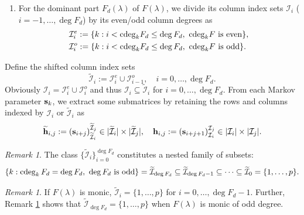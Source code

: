 \documentclass[12pt,reqno]{amsart}
\theoremstyle{plain}
\numberwithin{equation}{section}
\theoremstyle{remark}
\newtheorem{remark}[theorem]{Remark}
\def\wtilde{\widetilde} \def\what{\widehat}
\begin{document}
\begin{enumerate}[label=\textbf{Step \arabic*}, start=4, align=left, leftmargin=*]
\item \label{step4} For the dominant part $F_d(\lambda)$ of $F(\lambda)$, we divide its column index sets $\mathcal I_i$ ($i=-1,\ldots,\deg F_d$) by its even/odd column degrees as
\begin{align*}
&\mathcal I_i^e:=\{k : i< {\rm cdeg}_kF_d\leq \deg F_d,\ {\rm cdeg}_kF  {\rm\ is\ even}\},\\
&\mathcal I_i^o:=\{k : i< {\rm cdeg}_kF_d\leq \deg F_d,\ {\rm cdeg}_kF  {\rm\ is\ odd}\}.
\end{align*}
\end{enumerate}
 Define the shifted column index sets 
$$
\wtilde {\mathcal I}_i:=\mathcal I_i^e\cup \mathcal I_{i-1}^o,\quad  i=0,\ldots,\deg F_d.
$$
Obviously $\mathcal I_i=\mathcal I_i^e\cup \mathcal I_i^o$ and thus $\mathcal I_i \subseteq \wtilde {\mathcal I}_i$ for $i=0,\ldots,\deg F_d$.
 From each Markov parameter ${\bf s}_k$, we extract some submatrices by retaining the rows and columns indexed by $\mathcal I_i$ or $\wtilde {\mathcal I}_i$  as 
$$\wtilde {\bf h}_{i,j}:=\left({\bf s}_{i+j}\right)_{\wtilde {\mathcal I}_i}^{\wtilde {\mathcal I}_j}\in |\wtilde {\mathcal I}_i|\times |\wtilde {\mathcal I}_j|,\quad {\bf  h}_{i,j}:=\left({\bf s}_{i+j+1}\right)_{\mathcal I_i}^{\mathcal I_j}\in |\mathcal I_i|\times |\mathcal I_j|.
$$


\begin{remark}\label{RemtildeFd}
The class $\{\wtilde {\mathcal I}_i\}_{i=0}^{\deg F_d}$ constitutes a nested family of subsets:
    $$ \left\{ k : \operatorname{cdeg}_k F_d = \deg F_d,\ \deg F_d {\rm\ is\ odd} \right\}=\wtilde {\mathcal I}_{\deg F_d}\subseteq \wtilde {\mathcal I}_{\deg F_d-1} \subseteq \cdots \subseteq \wtilde {\mathcal I}_0=\{1,\ldots,p\}.$$
\end{remark}


\begin{remark}\label{RemtI}
If $F(\lambda)$ is monic, 
    $
\wtilde {\mathcal I}_i=\{1,\ldots,p\}$ for $i=0,\ldots,\deg F_d-1$. Further, Remark \ref{RemtildeFd} shows that $\wtilde {\mathcal I}_{\deg F_d}=\{1,\ldots,p\}$ when $F(\lambda)$ is monic of odd degree.
\end{remark}
\end{document}
